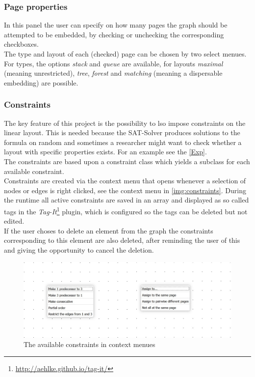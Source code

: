 \subsubsection{Page properties}
\label{imp_pages}
In this panel the user can specify on how many pages the graph should be attempted to be embedded, by checking or unchecking the corresponding checkboxes.\\
The type and layout of each (checked) page can be chosen by two select menues. For types, the options \textit{stack} and \textit{queue} are available, for layouts \textit{maximal} (meaning unrestricted), \textit{tree}, \textit{forest} and \textit{matching} (meaning a dispersable embedding) are possible.
\subsubsection{Constraints}
\label{imp_constr}
The key feature of this project is the possibility to lso impose constraints on the linear layout. This is needed because the SAT-Solver produces solutions to the formula on random and sometimes a researcher might want to check whether a layout with specific properties exists. For an example see the \autoref{Exp}.\\
The constraints are based upon a constraint class which yields a subclass for each available constraint.\\
Constraints are created via the context menu that opens whenever a selection of nodes or edges is right clicked, see the context menu in \autoref{img:constraints}.
During the runtime all active constraints are saved in an array and displayed as so called tags in the \textit{Tag-It}\footnote{\url{http://aehlke.github.io/tag-it/}} plugin, which is configured so the tags can be deleted but not edited.\\
If the user choses to delete an element from the graph the constraints corresponding to this element are also deleted, after reminding the user of this and giving the opportunity to cancel the deletion.
\begin{figure}
\begin{center}
\includegraphics[width=\textwidth]{figures/figIndex/Constraints.jpg}
\caption{The available constraints in context menues}
\label{img:constraints}
\end{center}
\end{figure}
